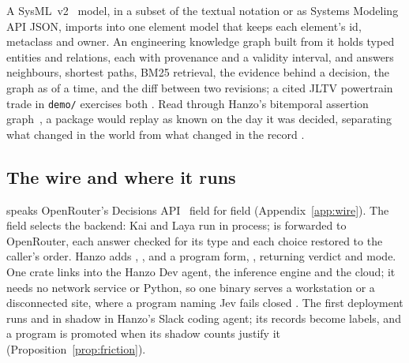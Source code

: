 A SysML~v2~\cite{sysmlv2} model, in a subset of the textual notation or as
Systems Modeling API JSON, imports into one element model that keeps each
element's id, metaclass and owner. An engineering knowledge graph built from it
holds typed entities and relations, each with provenance and a validity
interval, and answers neighbours, shortest paths, BM25 retrieval, the evidence
behind a decision, the graph as of a time, and the diff between two revisions;
a cited JLTV powertrain trade in \texttt{demo/} exercises both \shipped. Read
through Hanzo's bitemporal assertion graph~\cite{hanzographpaper}, a package
would replay as known on the day it was decided, separating what changed in the
world from what changed in the record \proposed.

\subsection{The wire and where it runs}

 speaks OpenRouter's Decisions
API~\cite{openrouterdecisions} field for field (Appendix~\ref{app:wire}). The
 field selects the backend: Kai and Laya run in process;
 is forwarded to OpenRouter, each answer checked for its
type and each choice restored to the caller's order. Hanzo adds
, , and a program form,
, returning verdict and mode. One crate links into the
Hanzo Dev agent, the inference engine and the cloud; it needs no network service
or Python, so one binary serves a workstation or a disconnected site, where a
program naming Jev fails closed \proposed. The first deployment runs
 and  in shadow in Hanzo's Slack
coding agent; its records become labels, and a program is promoted when its
shadow counts justify it (Proposition~\ref{prop:friction}).
